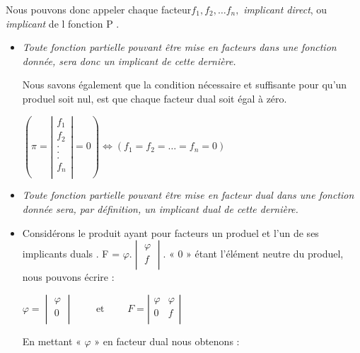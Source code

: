 Nous pouvons donc appeler chaque facteur$f_{1},f_{2},\ldots f_{n},$
\textsl{implicant direct}, ou \textsl{implicant }de l fonction \og P \fg{}.

\begin{itemize}
\item \textsl{Toute fonction partielle pouvant être mise en facteurs dans une fonction donnée, sera donc un implicant de cette dernière.}

Nous savons également que la condition nécessaire et suffisante pour qu'un produel soit nul, est que chaque facteur dual soit égal à zéro.

\medskip 

$ \left( \pi = \left| \begin{array}{c} 
                f_1 \\ f_2 \\ . \\ . \\ . \\ f_n\\
                          \end{array}
                    \right| = 0 
  \right) \Longleftrightarrow (f_1 = f_2 = \ldots = f_n = 0 )  
$ 

\item \textsl {Toute fonction partielle pouvant être mise en facteur dual dans une fonction donnée sera,  par définition, un implicant dual de cette dernière.
}

\item Considérons le produit ayant pour facteurs un produel et l'un de ses implicants duals . F = $\varphi . \begin{vmatrix} \varphi \\ f \\ \end{vmatrix} $. « $0$ » étant l'élément neutre du produel, nous pouvons écrire : 

\centerline { $\varphi = \begin{vmatrix} \varphi \\ 0 \\ \end{vmatrix} \qquad \text{ et }  \qquad 
F =  \left| \begin{array}{c|c} \varphi & \varphi \\ 0 & f \\
\end{array} \right|$   
} 

En mettant « $\varphi$ » en facteur dual nous obtenons : 


\end{itemize}
